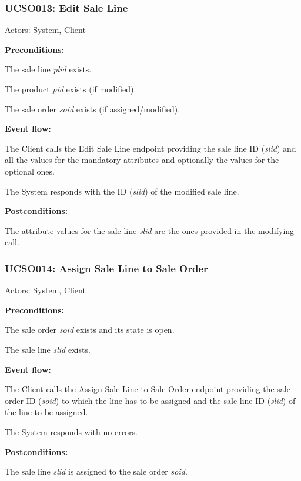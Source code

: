\begin{ucbox}{\subsubsection{UCSO013: Edit Sale Line}}
\label{UCSO013}

Actors: System, Client

\textbf{Preconditions:}

\ucitem The sale line \textit{plid} exists.

\ucitem The product \textit{pid} exists (if modified).

\ucitem The sale order \textit{soid} exists (if assigned/modified).

\textbf{Event flow:}

\ucitem The Client calls the Edit Sale Line endpoint providing the sale line ID (\textit{slid}) and all the values for the mandatory attributes and optionally the values for the optional 
ones.

\ucitem The System responds with the ID (\textit{slid}) of the modified sale line.

\textbf{Postconditions:}

\ucitem The attribute values for the sale line \textit{slid} are the ones provided in the modifying call.

\end{ucbox}

\begin{ucbox}{\subsubsection{UCSO014: Assign Sale Line to Sale Order}}
\label{UCSO014}

Actors: System, Client

\textbf{Preconditions:}

\ucitem The sale order \textit{soid} exists and its state is open.

\ucitem The sale line \textit{slid} exists.

\textbf{Event flow:}

\ucitem The Client calls the Assign Sale Line to Sale Order endpoint providing the sale order ID (\textit{soid}) to which the line has to be assigned and the sale line ID (\textit{slid}) of the line to be assigned.

\ucitem The System responds with no errors.

\textbf{Postconditions:}

\ucitem The sale line \textit{slid} is assigned to the sale order \textit{soid}.

\end{ucbox}

